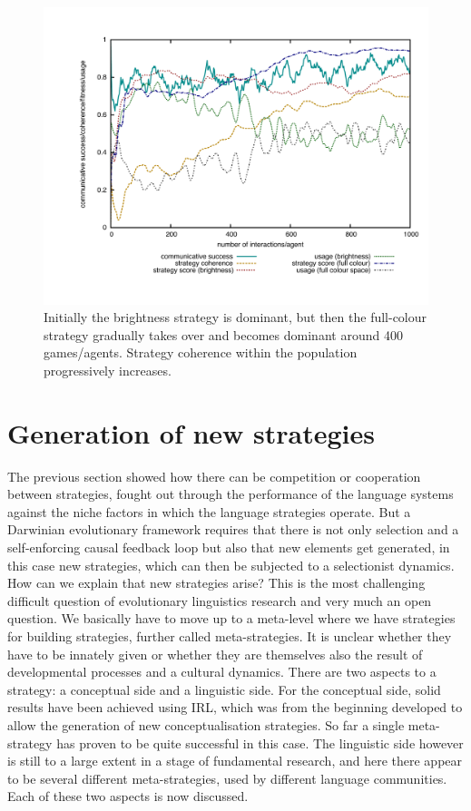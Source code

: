 \begin{figure}[b]
\centerline{\includegraphics[width=.9\textwidth]{chap12/figs/strategies-competition.pdf}}
\caption{{Initially the brightness strategy is dominant, but then the full-colour 
strategy gradually takes over and becomes dominant around 400 games/agents. Strategy coherence within the population
progressively increases.}
\label{fig:strategies-dynamics}}
\end{figure}

\section{Generation of new strategies}

The previous section showed how there can be competition or cooperation between strategies, fought out through the 
performance of the language systems against the niche factors in which 
the language strategies operate. But a Darwinian evolutionary framework requires that there is not only 
selection and a self-enforcing causal feedback loop 
but also that new elements get generated, in this case new strategies, which can then be subjected to 
a selectionist dynamics. How can we explain that new 
strategies arise? This is the most challenging difficult question of evolutionary linguistics research and very much an 
open question. We basically have to move up to a meta-level where we have strategies for building 
strategies, further called meta-strategies.  It is unclear whether they have to be innately given or 
whether they are themselves also the result of developmental processes and a cultural dynamics. 
There are two aspects to a strategy: a conceptual side and a linguistic side. For the conceptual 
side, solid results have been achieved using IRL, which was from the beginning developed to allow the generation of 
new conceptualisation strategies. So far a single meta-strategy has proven to be quite successful in this case. 
The linguistic side however is still to a large extent in a stage of fundamental research, and here there appear to 
be several different meta-strategies, used by different language communities. Each of these two aspects is now 
discussed.


